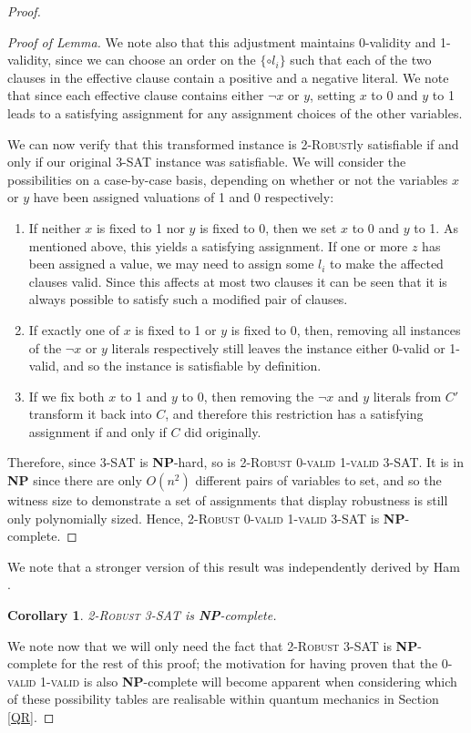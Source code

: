 \documentclass[reprint]{revtex4-1}
\newtheorem{cor}{Corollary}
\theoremstyle{definition}
\begin{document}
\begin{proof}
\begin{proof}[Proof of Lemma]
 We note also that this adjustment maintains 0-validity and 1-validity, since we can choose an order on the $\{\circ l_i\}$ such that each of the two clauses in the effective clause contain a positive and a negative literal. We note that since each effective clause contains either $\neg x$ or $y$, setting $x$ to 0 and $y$ to 1 leads to a satisfying assignment for any assignment choices of the other variables. 

We can now verify that this transformed instance is \textsc{2-Robust}ly satisfiable if and only if our original \textsc{3-SAT} instance was satisfiable. We will consider the possibilities on a case-by-case basis, depending on whether or not the variables $x$ or $y$ have been assigned valuations of 1 and 0 respectively:
\begin{enumerate}
\item If neither $x$ is fixed to 1 nor $y$ is fixed to 0, then we set $x$ to 0 and $y$ to 1. As mentioned above, this yields a satisfying assignment. If one or more $z$ has been assigned a value, we may need to assign some $l_i$ to make the affected clauses valid. Since this affects at most two clauses it can be seen that it is always possible to satisfy such a modified pair of clauses.

\item If exactly one of $x$ is fixed to 1 or $y$ is fixed to 0, then, removing all instances of the $\neg x$ or $y$ literals respectively still leaves the instance either 0-valid or 1-valid, and so the instance is satisfiable by definition.

\item If we fix both $x$ to 1 and $y$ to 0, then removing the $\neg x$ and $y$ literals from $C'$ transform it back into $C$, and therefore this restriction has a satisfying assignment if and only if $C$ did originally.
\end{enumerate}
Therefore, since \textsc{3-SAT} is \textbf{NP}-hard, so is \textsc{2-Robust 0-valid 1-valid 3-SAT}. It is in \textbf{NP} since there are only $O(n^2)$ different pairs of variables to set, and so the witness size to demonstrate a set of assignments that display robustness is still only polynomially sized.  Hence,  \textsc{2-Robust 0-valid 1-valid 3-SAT} is \textbf{NP}-complete.

\end{proof}
We note that a stronger version of this result was independently derived by Ham \cite{Ham2017}.
\begin{cor}
\textsc{2-Robust 3-SAT} is \textbf{NP}-complete.
\end{cor}
We note now that we will only need the fact that \textsc{2-Robust 3-SAT} is \textbf{NP}-complete for the rest of this proof; the motivation for having proven that the \textsc{0-valid 1-valid} is also \textbf{NP}-complete will become apparent when considering which of these possibility tables are realisable within quantum mechanics in Section \ref{QR}.


\end{proof}
\end{document}
